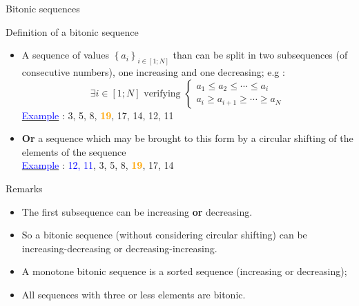 \documentclass[compress,10pt,aspectratio=169]{beamer}
\begin{document}
\begin{frame}[fragile]{Bitonic sequences}
    \scriptsize
    \begin{alertblock}{\small Definition of a bitonic sequence}
        \begin{itemize}
        \item A sequence of values $\left\{a_{i}\right\}_{i\in[1;N]}$ than can be split in two subsequences (of consecutive numbers), one increasing and one decreasing; e.g :
        \[
            \exists i\in\left[1;N\right] \mbox{ verifying } 
            \left\{
            \begin{array}{l}
                a_{1} \leq a_{2} \leq \cdots \leq a_{i} \\
                a_{i} \geq a_{i+1} \geq \cdots \geq a_{N}
            \end{array}
            \right.
        \]
        \underline{\textcolor{blue}{Example}} : 3, 5, 8, \textcolor{orange}{\textbf{19}}, 17, 14, 12, 11

        \item \textbf{Or} a sequence which may be brought to this form by a circular shifting of the elements of the sequence \\[2mm]
        \underline{\textcolor{blue}{Example}} : \textcolor{blue}{12, 11}, 3, 5, 8, \textcolor{orange}{\textbf{19}}, 17, 14
        \end{itemize}
    \end{alertblock}

    \begin{exampleblock}{\small Remarks}
        \begin{itemize}
            \item The first subsequence can be increasing \textbf{or} decreasing.
            \item So a bitonic sequence (without considering circular shifting) can be increasing-decreasing or
                  decreasing-increasing.
            \item A monotone bitonic sequence is a sorted sequence (increasing or decreasing);
            \item All sequences with three or less elements are bitonic.
        \end{itemize}
    \end{exampleblock}
\end{frame}
\end{document}
